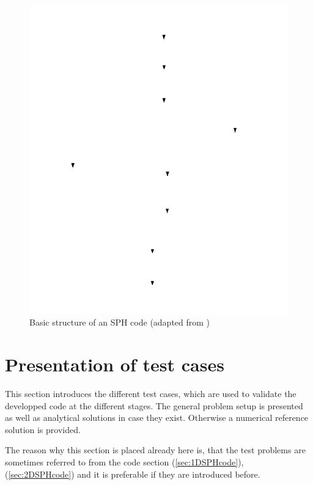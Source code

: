 \documentclass{report}
\begin{document}
\begin{figure}[!htbp]
  \centering
     \includegraphics[width=1.0\textwidth]{Graphics/general_structure_SPH}
  \caption{Basic structure of an SPH code (adapted from \cite{Liu2003}) }
  \label{fig:BasicSphCode}
\end{figure}



\section{Presentation of test cases}
\label{sec:testCases}
 
This section introduces the different test cases, which are used to validate the developped code at the different stages. The general problem setup is presented as well as analytical solutions in case they exist. Otherwise a numerical reference solution is provided.

The reason why this section is placed already here is, that the test problems are sometimes referred to from the code section (\ref{sec:1DSPHcode}),(\ref{sec:2DSPHcode}) and it is preferable if they are introduced before.
\end{document}
